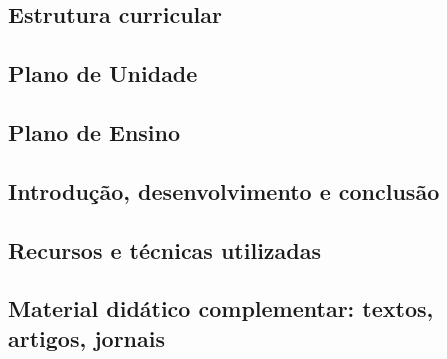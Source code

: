 \hspace{1.5cm}
\subsection*{Estrutura curricular}

\subsection*{Plano de Unidade}

\subsection*{Plano de Ensino}

\subsection*{Introdução, desenvolvimento e conclusão}

\subsection*{Recursos e técnicas utilizadas}

\subsection*{Material didático complementar: textos, artigos, jornais}


